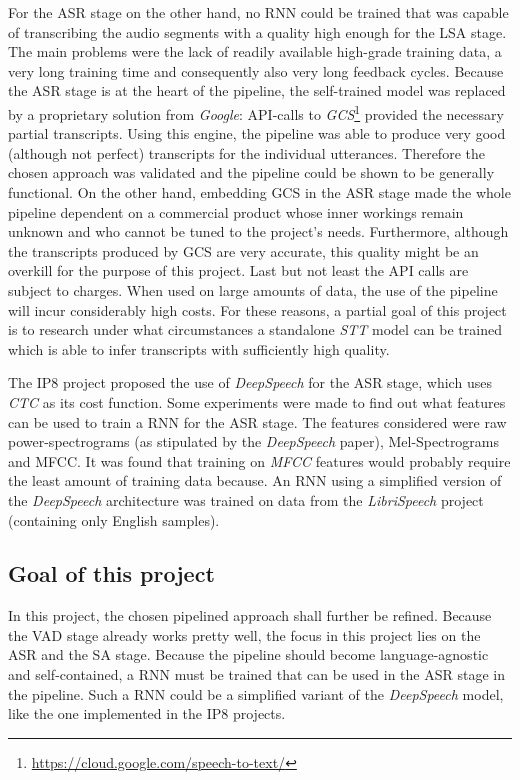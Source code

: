 For the \ac{ASR} stage on the other hand, no \ac{RNN} could be trained that was capable of transcribing the audio segments with a quality high enough for the \ac{LSA} stage. The main problems were the lack of readily available high-grade training data, a very long training time and consequently also very long feedback cycles. Because the \ac{ASR} stage is at the heart of the pipeline, the self-trained model was replaced by a proprietary solution from \textit{Google}: API-calls to \textit{\ac{GCS}}\footnote{\url{https://cloud.google.com/speech-to-text/}} provided the necessary partial transcripts. Using this engine, the pipeline was able to produce very good (although not perfect) transcripts for the individual utterances. Therefore the chosen approach was validated and the pipeline could be shown to be generally functional. On the other hand, embedding \ac{GCS} in the \ac{ASR} stage made the whole pipeline dependent on a commercial product whose inner workings remain unknown and who cannot be tuned to the project's needs. Furthermore, although the transcripts produced by \ac{GCS} are very accurate, this quality might be an overkill for the purpose of this project. Last but not least the API calls are subject to charges. When used on large amounts of data, the use of the pipeline will incur considerably high costs. For these reasons, a partial goal of this project is to research under what circumstances a standalone \textit{\ac{STT}} model can be trained which is able to infer transcripts with sufficiently high quality.

The IP8 project proposed the use of \textit{DeepSpeech} for the \ac{ASR} stage, which uses \textit{\ac{CTC}} \parencite{ctc_paper} as its cost function. Some experiments were made to find out what features can be used to train a \ac{RNN} for the \ac{ASR} stage. The features considered were raw power-spectrograms (as stipulated by the \textit{DeepSpeech} paper), Mel-Spectrograms and \ac{MFCC}. It was found that training on \textit{\ac{MFCC}} features would probably require the least amount of training data because. An \ac{RNN} using a simplified version of the \textit{DeepSpeech} architecture was trained on data from the \textit{LibriSpeech} project (containing only English samples).

\subsection{Goal of this project}

In this project, the chosen pipelined approach shall further be refined. Because the \ac{VAD} stage already works pretty well, the focus in this project lies on the \ac{ASR} and the \ac{SA} stage. Because the pipeline should become language-agnostic and self-contained, a \ac{RNN} must be trained that can be used in the \ac{ASR} stage in the pipeline. Such a \ac{RNN} could be a simplified variant of the \textit{DeepSpeech} model, like the one implemented in the IP8 projects. 

